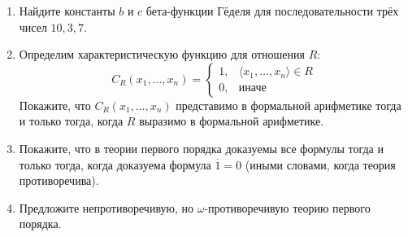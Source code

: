 \documentclass[10pt,a4paper,oneside]{article}
\begin{document}
\begin{enumerate}
\begin{enumerate}
\end{enumerate}
\item Найдите константы $b$ и $c$ бета-функции Гёделя для последовательности трёх чисел $10,3,7$.
\item Определим характеристическую функцию для отношения $R$:
$$C_R(x_1, \dots, x_n) = \left\{\begin{array}{ll}1,&\langle x_1,\dots,x_n\rangle \in R\\0,&\text{иначе}\end{array}\right.$$
Покажите, что $C_R(x_1,\dots,x_n)$ представимо в формальной арифметике тогда и только тогда, когда $R$ выразимо 
в формальной арифметике.
\item Покажите, что в теории первого порядка доказуемы все формулы тогда и только тогда, когда доказуема формула $\overline{1} = 0$
(иными словами, когда теория противоречива).
\item Предложите непротиворечивую, но $\omega$-противоречивую теорию первого порядка.
\end{enumerate}
\end{document}
